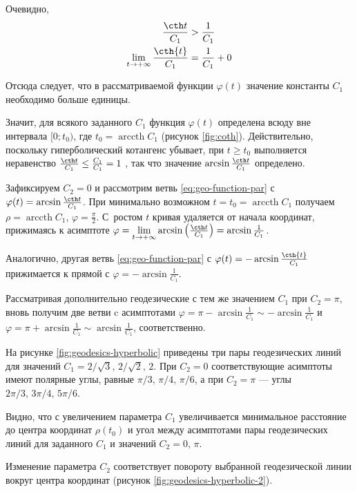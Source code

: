 \documentclass{article}
\numberwithin{equation}{section}
\renewcommand{\phi}{\varphi}
\DeclareMathOperator{\arccth}{arccth}
\begin{document}


Очевидно,
\begin{align*}
  \frac{\cth t}{C_1} &> \frac{1}{C_1} \\
  \lim_{t \to +\infty}{\frac{\cth{t}}{C_1}} &= \frac{1}{C_1} + 0
\end{align*}

Отсюда следует, что в рассматриваемой функции $\phi(t)$ значение
константы $C_1$ необходимо больше единицы.

Значит, для всякого заданного $C_1$ функция $\phi(t)$ определена всюду
вне интервала $[0;t_0)$, где $t_0 = \arccth{C_1}$ (рисунок
\ref{fig:coth}). Действительно, поскольку гиперболический котангенс
убывает, при $t \geq t_0$ выполняется неравенство $\frac{\cth t}{C_1}
\leq \frac{C_1}{C_1} = 1$ , так что значение
$\arcsin{\frac{\cth t}{C_1}}$ определено.

Зафиксируем $C_2 = 0$ и рассмотрим ветвь \eqref{eq:geo-function-par} с
$\phi(t) = \arcsin\frac{\cth t}{C_1}$. При минимально возможном $t =
t_0 = \arccth{C_1}$ получаем $\rho = \arccth{C_1}$, $\phi =
\frac{\pi}{2}$. С ростом $t$ кривая удаляется от начала координат,
прижимаясь к асимптоте $\phi = \lim \limits_{t \to +\infty}
\arcsin{\left(\frac{\cth t}{C_1}\right)} = \arcsin{\frac{1}{C_1}}$.

Аналогично, другая ветвь \eqref{eq:geo-function-par} с $\phi(t) =
-\arcsin\frac{\cth{t}}{C_1}$ прижимается к прямой с $\phi =
-\arcsin{\frac{1}{C_1}}$.

Рассматривая дополнительно геодезические с тем же значением $C_1$ при
$C_2 = \pi$, вновь получим две ветви c асимптотами $\phi =
\pi-\arcsin\frac{1}{C_1} \sim -\arcsin\frac{1}{C_1}$ и $\phi =
\pi+\arcsin\frac{1}{C_1} \sim \arcsin\frac{1}{C_1}$, соответственно.



На рисунке \ref{fig:geodesics-hyperbolic} приведены три пары
геодезических линий для значений $C_1=2/\sqrt{3},\,2/\sqrt{2},\,2$.
При $C_2=0$ соответствующие асимптоты имеют полярные углы, равные
$\pi/3,\,\pi/4,\,\pi/6$, а при $C_2=\pi$ — углы
$2\pi/3,\,3\pi/4,\,5\pi/6$.

Видно, что с увеличением параметра $C_1$ увеличивается минимальное
расстояние до центра координат $\rho(t_0)$ и угол между асимптотами
пары геодезических линий для заданного $C_1$ и значений $C_2=0,\,\pi$.



Изменение параметра $C_2$ соответствует повороту выбранной
геодезической линии вокруг центра координат (рисунок
\ref{fig:geodesics-hyperbolic-2}).
\end{document}
